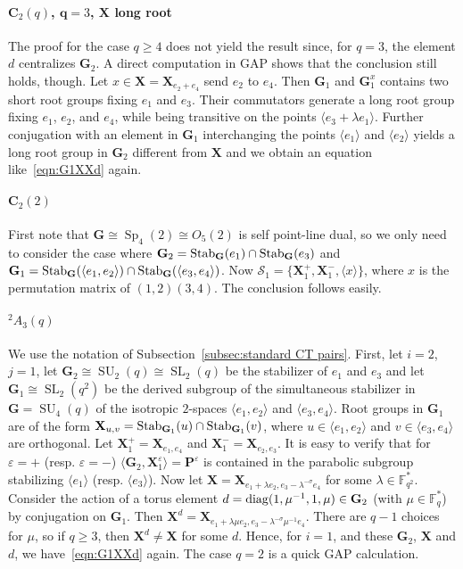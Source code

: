 \documentclass[12pt]{amsart}
\theoremstyle{definition}
\newcommand{\cS}{{\mathcal S}}
\newcommand{\twA}{{}^2\! {A}}
\newcommand{\diag}{\mathop{\rm diag}\nolimits}
\DeclareMathOperator{\SL}{SL}
\newcommand{\FF}{{\mathbb F}}
\DeclareMathOperator{\SU}{SU}
\DeclareMathOperator{\Sp}{Sp}
\newcommand{\Stab}{\mathop{\rm Stab}}
\newcommand{\vep}{\varepsilon}
\newcommand{\amgrpG}{{\mathbf{G}}}
\newcommand{\amgrpP}{{\mathbf{P}}}
\newcommand{\amgrpX}{{\mathbf{X}}}
\begin{document}
\paragraph{\bf ${\mathbf C_2(q)}$, ${\mathbf q =3}$, $\mathbf \amgrpX$ long root}
The proof for the case $q\ge 4$ does not yield the result since, for $q=3$, the element $d$ centralizes $\amgrpG_2$.
A direct computation in GAP shows that the conclusion still holds, though.
Let $x\in \amgrpX=\amgrpX_{e_2+e_4}$ send $e_2$ to $e_4$.
Then $\amgrpG_1$ and $\amgrpG_1^x$ contains two short root groups fixing $e_1$ and $e_3$.
Their commutators generate a long root group fixing $e_1$, $e_2$, and $e_4$, while being transitive on the points $\langle e_3+\lambda e_1\rangle$. Further conjugation with an element in $\amgrpG_1$ interchanging the points $\langle e_1\rangle$ and $\langle e_2\rangle$ yields a long root group in $\amgrpG_2$ different from $\amgrpX$ and we obtain an equation like~\eqref{eqn:G1XXd} again.
 
 
\paragraph{\bf ${\mathbf C_2(2)}$} 
First note that $\amgrpG\cong\Sp_4(2)\cong O_5(2)$ is self point-line dual, so we only need to consider the case where $\amgrpG_2=\Stab_\amgrpG(e_1)\cap\Stab_\amgrpG(e_3)$ and 
 $\amgrpG_1=\Stab_\amgrpG(\langle e_1,e_2\rangle)\cap \Stab_\amgrpG(\langle e_3,e_4\rangle)$.
 Now $\cS_1=\{\amgrpX_1^+, \amgrpX_1^-, \langle x\rangle\}$, where $x$ is the permutation matrix of $(1,2)(3,4)$.
The conclusion follows easily.

\paragraph{\bf ${\mathbf\twA_3(q)}$}
We use  the notation of Subsection~\ref{subsec:standard CT pairs}.
First, let $i=2$, $j=1$, let $\amgrpG_2\cong \SU_2(q)\cong\SL_2(q)$ be the stabilizer of $e_1$ and $e_3$ and let $\amgrpG_1\cong\SL_2(q^2)$ be the derived subgroup of the simultaneous stabilizer in $\amgrpG=\SU_4(q)$ of the isotropic $2$-spaces $\langle e_1,e_2\rangle$ and $\langle e_3,e_4\rangle$.
Root groups in $\amgrpG_1$ are of the form
 $\amgrpX_{u,v}=\Stab_{\amgrpG_1}(u)\cap \Stab_{\amgrpG_1}(v)$, where 
  $u\in \langle e_1,e_2\rangle$ and $v\in\langle e_3,e_4\rangle$ are orthogonal.
Let $\amgrpX_1^+=\amgrpX_{e_1,e_4}$ and $\amgrpX_1^-=\amgrpX_{e_2,e_3}$.
It is easy to verify that for $\vep=+$ (resp. $\vep=-$) $\langle \amgrpG_2,\amgrpX_1^\vep\rangle=\amgrpP^\vep$  is contained in the parabolic subgroup stabilizing $\langle e_1\rangle $ (resp. $\langle e_3\rangle$).
Now let $\amgrpX=\amgrpX_{e_1+\lambda e_2, e_3-\lambda^{-\sigma} e_4}$ for some $\lambda\in\FF_{q^2}^*$.
Consider the action of a torus element $d=\diag(1, \mu^{-1}, 1, \mu)\in \amgrpG_2$ 
(with $\mu\in \FF_q^*$)
by conjugation on $\amgrpG_1$. 
Then $\amgrpX^d=\amgrpX_{e_1+ \lambda\mu e_2 ,e_3-\lambda^{-\sigma}\mu^{-1} e_4}$.
There are $q-1$ choices for $\mu$, so if $q\ge 3$, then $\amgrpX^d\ne \amgrpX$ for some $d$. Hence, for $i=1$, and these $\amgrpG_2$, $\amgrpX$ and $d$, we have~\eqref{eqn:G1XXd} again.
The case $q=2$ is a quick GAP calculation.
\end{document}
